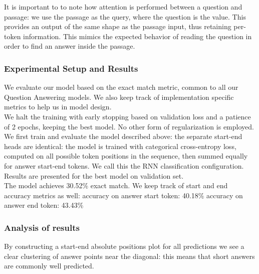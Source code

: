 \documentclass{article}
\begin{document}
It is important to to note how attention is performed between a question and passage: we use the passage as the query, where the question is the value.
This provides an output of the same shape as the passage input, thus retaining per-token information.
This mimics the expected behavior of reading the question in order to find an answer inside the passage.

\subsubsection{Experimental Setup and Results}

We evaluate our model based on the exact match metric, common to all our Question Answering models.
We also keep track of implementation specific metrics to help us in model design.\\

We halt the training with early stopping based on validation loss and a patience of 2 epochs, keeping the best model. No other form of regularization is employed.\\

We first train and evaluate the model described above:
the separate start-end heads are identical: the model is trained with categorical cross-entropy loss, computed on all possible token positions in the sequence, then summed equally for answer start-end tokens.
We call this the RNN classification configuration.\\

Results are presented for the best model on validation set.\\

The model achieves 30.52\% exact match.
We keep track of start and end accuracy metrics as well:
accuracy on answer start token: 40.18\%
accuracy on answer end token:   43.43\%

\subsubsection{Analysis of results}
\hfill \break
By constructing a start-end absolute positions plot for all predictions we see a clear clustering of answer points near the diagonal: this means that short answers are commonly well predicted. %
\end{document}
